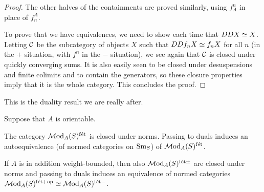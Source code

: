 \documentclass{amsart}
\numberwithin{proposition}{section}
\numberwithin{equation}{section}
\def\fet{\mathrm{f\acute et}}
\begin{document}
\begin{proof}
The other halves of the containments are proved similarly, using $f^n_A$ in place of $f_n^A$.

To prove that we have equivalences, we need to show each time that $DDX \simeq X$.
Letting $\mathcal C$ be the subcategory of objects $X$ such that $DDf_n X \simeq f_nX$ for all $n$ (in the $+$ situation, with $f^n$ in the $-$ situation), we see again that $\mathcal C$ is closed under quickly converging sums.
It is also easily seen to be closed under desuspensions and finite colimits and to contain the generators, so these closure properties imply that it is the whole category.
This concludes the proof.
\end{proof}

This is the duality result we are really after.
\begin{proposition} \label{prop:duality}
Suppose that $A$ is orientable.

The category $\Mod_{A}(S)^{\fet}$ is closed under norms.
Passing to duals induces an autoequivalence (of normed categories on ${\mathrm{S}\mathrm{m}}_S$) of $\Mod_A(S)^{\fet}$.

If $A$ is in addition weight-bounded, then also $\Mod_{A}(S)^{\fet\pm}$ are closed under norms and passing to duals induces an equivalence of normed categories $\Mod_A(S)^{\fet+\op} \wequi \Mod_A(S)^{\fet-}$.
\end{proposition}
\end{document}
